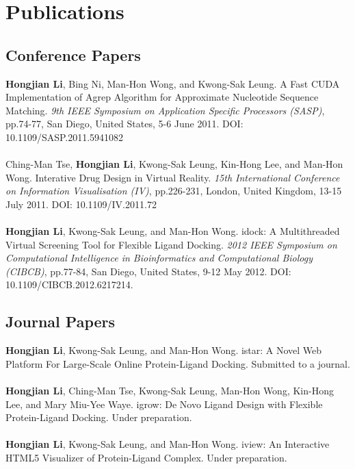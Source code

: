 \chapter{Publications}

\section{Conference Papers}

\textbf{Hongjian Li}, Bing Ni, Man-Hon Wong, and Kwong-Sak Leung. A Fast CUDA Implementation of Agrep Algorithm for Approximate Nucleotide Sequence Matching. \textit{9th IEEE Symposium on Application Specific Processors (SASP)}, pp.74-77, San Diego, United States, 5-6 June 2011. DOI: 10.1109/SASP.2011.5941082
\\\\
Ching-Man Tse, \textbf{Hongjian Li}, Kwong-Sak Leung, Kin-Hong Lee, and Man-Hon Wong. Interative Drug Design in Virtual Reality. \textit{15th International Conference on Information Visualisation (IV)}, pp.226-231, London, United Kingdom, 13-15 July 2011. DOI: 10.1109/IV.2011.72
\\\\
\textbf{Hongjian Li}, Kwong-Sak Leung, and Man-Hon Wong. idock: A Multithreaded Virtual Screening Tool for Flexible Ligand Docking. \textit{2012 IEEE Symposium on Computational Intelligence in Bioinformatics and Computational Biology (CIBCB)}, pp.77-84, San Diego, United States, 9-12 May 2012. DOI: 10.1109/CIBCB.2012.6217214.

\section{Journal Papers}

\textbf{Hongjian Li}, Kwong-Sak Leung, and Man-Hon Wong. istar: A Novel Web Platform For Large-Scale Online Protein-Ligand Docking. Submitted to a journal.
\\\\
\textbf{Hongjian Li}, Ching-Man Tse, Kwong-Sak Leung, Man-Hon Wong, Kin-Hong Lee, and Mary Miu-Yee Waye. igrow: De Novo Ligand Design with Flexible Protein-Ligand Docking. Under preparation.
\\\\
\textbf{Hongjian Li}, Kwong-Sak Leung, and Man-Hon Wong. iview: An Interactive HTML5 Visualizer of Protein-Ligand Complex. Under preparation.

\chapterend
